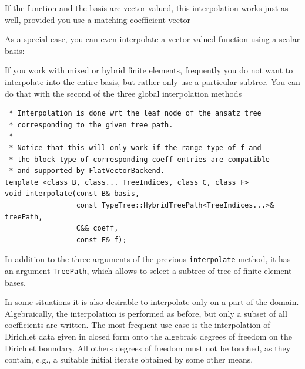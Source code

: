 \documentclass[a4paper,10pt,headings=normal,bibliography=totoc]{scrartcl}
\newcommand{\cpp}[1]{\lstinline[basicstyle=\ttfamily]!#1!}
\begin{document}
If the function and the basis are vector-valued, this interpolation works just as well, provided you use
a matching coefficient vector
%

%
As a special case, you can even interpolate a vector-valued function using a scalar basis:
%

%

If you work with mixed or hybrid finite elements, frequently you do not want to interpolate into
the entire basis, but rather only use a particular subtree.  You can do that with the second of the
three global interpolation methods
\begin{lstlisting}
 * Interpolation is done wrt the leaf node of the ansatz tree
 * corresponding to the given tree path.
 *
 * Notice that this will only work if the range type of f and
 * the block type of corresponding coeff entries are compatible
 * and supported by FlatVectorBackend.
template <class B, class... TreeIndices, class C, class F>
void interpolate(const B& basis,
                 const TypeTree::HybridTreePath<TreeIndices...>& treePath,
                 C&& coeff,
                 const F& f);
\end{lstlisting}
In addition to the three arguments of the previous \cpp{interpolate} method, it has an argument \cpp{TreePath},
which allows to select a subtree of tree of finite element bases.

\bigskip

In some situations it is also desirable to interpolate only on a part of the domain.  Algebraically, the interpolation
is performed as before, but only a subset of all coefficients are written.  The most frequent use-case is the interpolation
of Dirichlet data given in closed form onto the algebraic degrees of freedom on the Dirichlet boundary.  All others
degrees of freedom must not be touched, as they contain, e.g., a suitable initial iterate obtained by some other
means.
\end{document}
